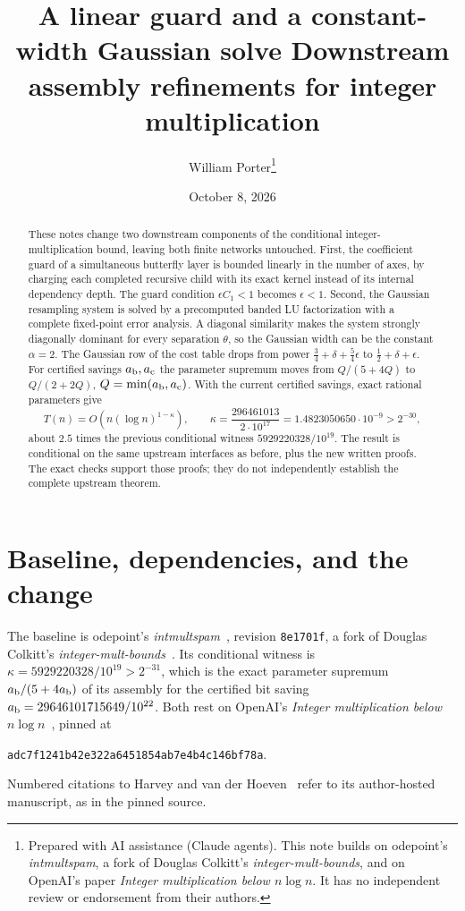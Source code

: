 \documentclass[11pt]{article}
\title{A linear guard and a constant-width Gaussian solve\newline
\large Downstream assembly refinements for integer multiplication}
\author{William Porter\thanks{Prepared with AI assistance (Claude agents).
This note builds on odepoint's \emph{intmultspam}, a fork of Douglas Colkitt's
\emph{integer-mult-bounds}, and on OpenAI's paper \emph{Integer multiplication
below $n\log n$}. It has no independent review or endorsement from their
authors.}}
\date{October 8, 2026}
\newcommand{\ab}{a_{\rm b}}
\newcommand{\ac}{a_{\rm c}}
\begin{document}
\maketitle
\begin{abstract}
These notes change two downstream components of the conditional
integer-multiplication bound, leaving both finite networks untouched.
First, the coefficient guard of a simultaneous butterfly layer is bounded
linearly in the number of axes, by charging each completed recursive child
with its exact kernel instead of its internal dependency depth. The guard
condition $\epsilon C_1<1$ becomes $\epsilon<1$. Second, the Gaussian
resampling system is solved by a precomputed banded LU factorization with a
complete fixed-point error analysis. A diagonal similarity makes the system
strongly diagonally dominant for every separation $\theta$, so the Gaussian
width can be the constant $\alpha=2$. The Gaussian row of the cost table
drops from power $\frac34+\delta+\frac54\epsilon$ to
$\frac12+\delta+\epsilon$. For certified savings $\ab,\ac$ the parameter
supremum moves from $Q/(5+4Q)$ to $Q/(2+2Q)$, $Q=\min(\ab,\ac)$. With the
current certified savings, exact rational parameters give
\[
 T(n)=O\!\left(n(\log n)^{1-\kappa}\right),\qquad
 \kappa=\frac{296461013}{2\cdot10^{17}}=1.4823050650\cdot10^{-9}>2^{-30},
\]
about $2.5$ times the previous conditional witness $5929220328/10^{19}$.
The result is conditional on the same upstream interfaces as before, plus
the new written proofs. The exact checks support those proofs; they do not
independently establish the complete upstream theorem.
\end{abstract}

\section{Baseline, dependencies, and the change}
The baseline is odepoint's \emph{intmultspam}~\cite{fork}, revision
\texttt{8e1701f}, a fork of Douglas Colkitt's
\emph{integer-mult-bounds}~\cite{baseline}. Its conditional witness is
$\kappa=5929220328/10^{19}>2^{-31}$, which is the exact parameter supremum
$\ab/(5+4\ab)$ of its assembly for the certified bit saving
$\ab=29646101715649/10^{22}$. Both rest on OpenAI's \emph{Integer
multiplication below $n\log n$}~\cite{upstream}, pinned at
\begin{center}\texttt{adc7f1241b42e322a6451854ab7e4b4c146bf78a}.\end{center}
Numbered citations to Harvey and van der Hoeven~\cite{HarveyHoeven2021}
refer to its author-hosted manuscript, as in the pinned source.
\end{document}
